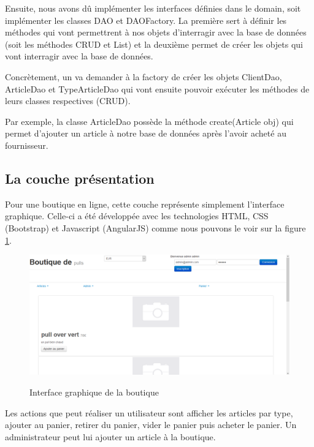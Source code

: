 \documentclass[a4paper]{article}
\begin{document}
    \bigskip
    
    Ensuite, nous avons dû implémenter les interfaces définies dans le domain, soit implémenter les classes DAO et DAOFactory. La première sert à définir les méthodes qui vont permettrent à nos objets d'interragir avec la base de données (soit les méthodes CRUD et List) et la deuxième permet de créer les objets qui vont interragir avec la base de données.
    
    \bigskip
    
    Concrètement, un va demander à la factory de créer les objets ClientDao, ArticleDao et TypeArticleDao qui vont ensuite pouvoir exécuter les méthodes de leurs classes respectives (CRUD).
    
    \bigskip
    
    Par exemple, la classe ArticleDao possède la méthode create(Article obj) qui permet d'ajouter un article à notre base de données après l'avoir acheté au fournisseur.
    
    \subsection{La couche présentation}
        
    Pour une boutique en ligne, cette couche représente simplement l'interface graphique. Celle-ci a été développée avec les technologies HTML, CSS (Bootstrap) et Javascript (AngularJS) comme nous pouvons le voir sur la figure \ref{ihm}.
    
    \begin{figure}[H]
    \centering
    \caption{Interface graphique de la boutique}
    \includegraphics[width=\textwidth]{ihm.png}
    \label{ihm}
    \end{figure}
    
    \bigskip
    
    Les actions que peut réaliser un utilisateur sont afficher les articles par type, ajouter au panier, retirer du panier, vider le panier puis acheter le panier. Un administrateur peut lui ajouter un article à la boutique.
    
\end{document}
